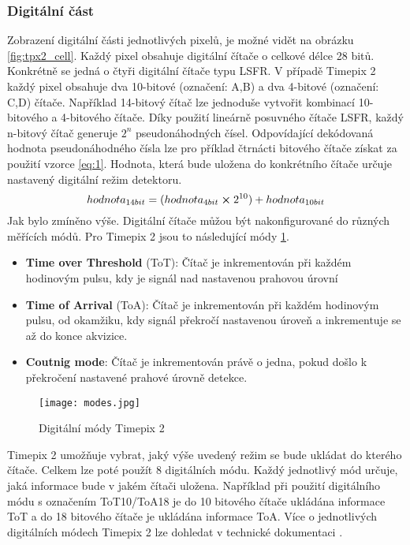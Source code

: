 \subsubsection{Digitální část}
\label{Digitálni cast}
Zobrazení digitální části jednotlivých pixelů, je možné vidět na obrázku \ref{fig:tpx2_cell}. Každý pixel obsahuje digitální čítače o celkové délce 28 bitů. Konkrétně se jedná o čtyři digitální čítače typu LSFR. V případě Timepix 2 každý pixel obsahuje dva 10-bitové (označení: A,B) a dva 4-bitové (označení: C,D) čítače. Například 14-bitový čítač lze jednoduše vytvořit kombinací 10-bitového a 4-bitového čítače. Díky použití lineárně posuvného čítače LSFR, každý n-bitový čítač generuje $2^n$ pseudonáhodných čísel. Odpovídající dekódovaná hodnota pseudonáhodného čísla lze pro příklad čtrnácti bitového čítače získat za použití vzorce \ref{eq:1}. Hodnota, která bude uložena do konkrétního čítače určuje nastavený digitální režim detektoru. 
\begin{equation}
	hodnota_{14bit} = (hodnota_{4bit} \cross 2^{10}) + hodnota_{10bit}
	\label{eq:1}
\end{equation}
Jak bylo zmíněno výše. Digitální čítače můžou být nakonfigurované do různých měřících módů. Pro Timepix 2 jsou to následující módy \ref{fig:modes}. 
\begin{itemize}
	\item \textbf{Time over Threshold} (ToT): Čítač je inkrementován při každém hodinovým pulsu, kdy je signál nad nastavenou prahovou úrovní
	\item \textbf{Time of Arrival} (ToA): Čítač je inkrementován při každém hodinovým pulsu, od okamžiku, kdy signál překročí nastavenou úroveň a inkrementuje se až do konce akvizice.
	\item \textbf{Coutnig mode}: Čítač je inkrementován právě o jedna, pokud došlo k překročení nastavené prahové úrovně detekce.
\label{item:modes}
\end{itemize}
\begin{figure}[h!]
	\centering
	\captionsetup{justification=centering}
	\texttt{[image: modes.jpg]}
	\caption{Digitální módy Timepix 2 \cite{Manek}} 
	\label{fig:modes}
\end{figure}	
\par Timepix 2 umožňuje vybrat, jaký výše uvedený režim se bude ukládat do kterého čítače. Celkem lze poté použít 8 digitálních módu. Každý jednotlivý mód určuje, jaká informace bude v jakém čítači uložena. Například při použití digitálního módu s označením ToT10/ToA18  je do 10 bitového čítače ukládána informace ToT a do 18 bitového čítače je ukládána informace ToA. Více o jednotlivých digitálních módech Timepix 2 lze dohledat v technické dokumentaci \cite{tpx2_manual}.


